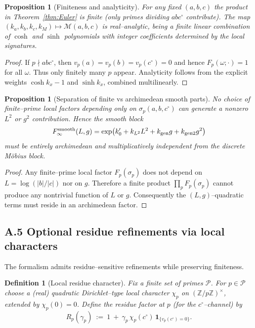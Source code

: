 \documentclass[12pt]{article}
\newtheorem{proposition}[theorem]{Proposition}
\newtheorem{definition}[theorem]{Definition}
\numberwithin{equation}{section}
\begin{document}
\begin{proposition}[Finiteness and analyticity]\label{prop:finite}
For any fixed $(a,b,c)$ the product in Theorem~\ref{thm:Euler} is finite (only primes dividing $abc^\circ$ contribute). The map $(k_a,k_b,k_c,k_M)\mapsto \mathcal{M}(a,b,c)$ is real–analytic, being a finite linear combination of $\cosh$ and $\sinh$ polynomials with integer coefficients determined by the local signatures.
\end{proposition}

\begin{proof}
If $p\nmid abc^\circ$, then $v_p(a)=v_p(b)=v_p(c^\circ)=0$ and hence $F_p(\omega;\cdot)=1$ for all $\omega$. Thus only finitely many $p$ appear. Analyticity follows from the explicit weights $\cosh k_x-1$ and $\sinh k_x$, combined multilinearly.
\end{proof}

\begin{proposition}[Separation of finite vs archimedean smooth parts]\label{prop:separation}
No choice of \emph{finite–prime} local factors depending only on $\sigma_p(a,b,c^\circ)$ can generate a nonzero $L^2$ or $g^2$ contribution. Hence the smooth block
\[
F_\infty^{\mathrm{smooth}}(L,g)=\exp\!\big(k_0'+k_{L^2}L^2+k_{\rm gen}g+k_{\rm gen2}g^2\big)
\]
must be entirely archimedean and multiplicatively independent from the discrete Möbius block.
\end{proposition}

\begin{proof}
Any finite–prime local factor $F_p(\sigma_p)$ does not depend on $L=\log(|b|/|c|)$ nor on $g$. Therefore a finite product $\prod_p F_p(\sigma_p)$ cannot produce any nontrivial function of $L$ or $g$. Consequently the $(L,g)$–quadratic terms must reside in an archimedean factor.
\end{proof}

\bigskip
\subsection*{A.5 \; Optional residue refinements via local characters}

The formalism admits residue–sensitive refinements while preserving finiteness.

\begin{definition}[Local residue character]
Fix a finite set of primes $\mathcal{P}$. For $p\in\mathcal{P}$ choose a (real) quadratic Dirichlet–type local character $\chi_p$ on $(\mathbb{Z}/p\mathbb{Z})^\times$, extended by $\chi_p(0)=0$. Define the residue factor at $p$ (for the $c^\circ$–channel) by
\[
R_p(\gamma_p) \ :=\ 1\ +\ \gamma_p\,\chi_p(c^\circ)\,\mathbf{1}_{\{v_p(c^\circ)=0\}}.
\]
\end{definition}
\end{document}
